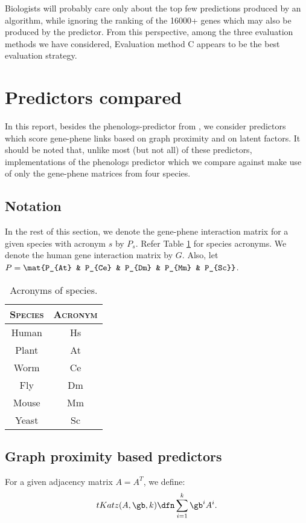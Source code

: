 \documentclass{article}
\begin{document}
Biologists will probably care only about the top few predictions produced by an algorithm, while ignoring the ranking of the 16000+ genes which may also be produced by the predictor. From this perspective, among the three evaluation methods we have considered, Evaluation method C appears to be the best evaluation strategy.

\section{Predictors compared}
In this report, besides the phenologs-predictor from \cite{McGaryOrthologousPhenotypes}, we consider predictors which score gene-phene links based on graph proximity and on latent factors. It should be noted that, unlike most (but not all) of these predictors, implementations of the phenologs predictor which we compare against make use of only the gene-phene matrices from four species.

\subsection{Notation}
\label{sec:Notation}
In the rest of this section, we denote the gene-phene interaction matrix for a given species with acronym $s$ by $P_s$. Refer Table \ref{tab:acronyms} for species acronyms. We denote the human gene interaction matrix by $G$. Also, let $P = \mat{P_{At} & P_{Ce} & P_{Dm} & P_{Mm} & P_{Sc}}$.

\begin{table}[ht]
\centering
\begin{tabular}{| c | c |} \hline
\textsc{Species} & \textsc{Acronym} \\ \hline
Human & Hs \\ \hline
Plant & At \\ \hline
Worm & Ce \\ \hline
Fly  & Dm \\ \hline
Mouse & Mm \\ \hline
Yeast & Sc \\ \hline
\end{tabular}
\caption{Acronyms of species.}
\label{tab:acronyms}
\end{table}


\subsection{Graph proximity based predictors}
\label{sec:Graph proximity based predictors}
For a given adjacency matrix $A = A^{T}$, we define: $$tKatz(A, \gb, k) \dfn \sum_{i = 1}^{k} \gb^{i} A^{i}.$$
\end{document}
